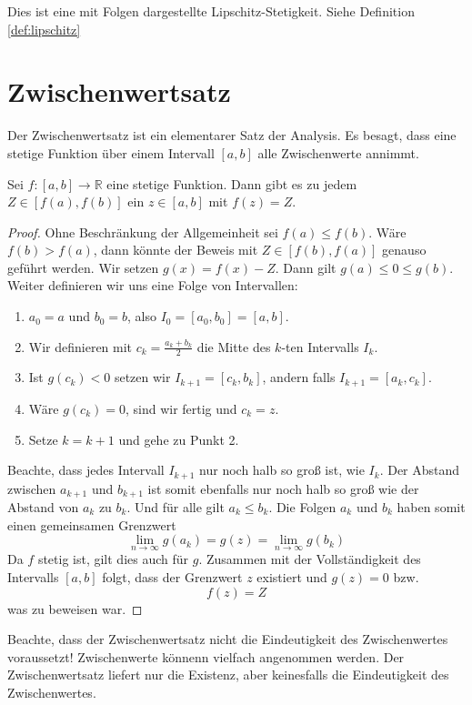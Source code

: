\begin{remark}
Dies ist eine mit Folgen dargestellte Lipschitz-Stetigkeit. Siehe Definition \ref{def:lipschitz}
\end{remark}

\section{Zwischenwertsatz}

Der Zwischenwertsatz ist ein elementarer Satz der Analysis. Es besagt, dass eine stetige Funktion über einem Intervall $[a,b]$ alle Zwischenwerte annimmt.

\begin{satz}[Zwischenwertsatz]\label{satz:zwischen}
Sei $f:[a,b]\longrightarrow \mathbb{R}$ eine stetige Funktion. Dann gibt es zu jedem $Z\in[f(a),f(b)]$ ein $z\in [a,b]$ mit $f(z)=Z$.
\end{satz}
\begin{proof}
Ohne Beschränkung der Allgemeinheit sei $f(a)\le f(b)$. Wäre $f(b)>f(a)$, dann könnte der Beweis mit $Z\in[f(b),f(a)]$ genauso geführt werden. Wir setzen $g(x) = f(x)-Z$. Dann gilt $g(a)\le 0 \le g(b)$. Weiter definieren wir uns eine Folge von Intervallen:

\begin{enumerate}
\item $a_0 = a$ und $b_0 = b$, also $I_0 = [a_0,b_0]=[a,b]$.
\item Wir definieren mit $c_k = \frac{a_k +b_k}{2}$ die Mitte des $k$-ten Intervalls $I_k$.
\item Ist $g(c_k)<0$ setzen wir $I_{k+1} = [c_k,b_k]$, andern falls $I_{k+1}=[a_k,c_k]$.
\item Wäre $g(c_k)=0$, sind wir fertig und $c_k=z$.
\item Setze $k=k+1$ und gehe zu Punkt 2.
\end{enumerate}
Beachte, dass jedes Intervall $I_{k+1}$ nur noch halb so groß ist, wie $I_k$. Der Abstand zwischen $a_{k+1}$ und $b_{k+1}$ ist somit ebenfalls nur noch halb so groß wie der Abstand von $a_k$ zu $b_k$. Und für alle gilt $a_k\le b_k$. Die Folgen $a_k$ und $b_k$ haben somit einen gemeinsamen Grenzwert
\begin{equation}
\lim_{n\rightarrow \infty} g(a_k) =g(z)=\lim_{n\rightarrow \infty} g(b_k)
\end{equation}
Da $f$ stetig ist, gilt dies auch für $g$. Zusammen mit der Vollständigkeit des Intervalls $[a,b]$ folgt, dass der Grenzwert $z$ existiert und $g(z)=0$ bzw.
\begin{equation}
f(z)=Z
\end{equation}
was zu beweisen war.
\end{proof}

\begin{remark}
Beachte, dass der Zwischenwertsatz nicht die Eindeutigkeit des Zwischenwertes voraussetzt! Zwischenwerte könnenn vielfach angenommen werden. Der Zwischenwertsatz liefert nur die Existenz, aber keinesfalls die Eindeutigkeit des Zwischenwertes.
\end{remark}
